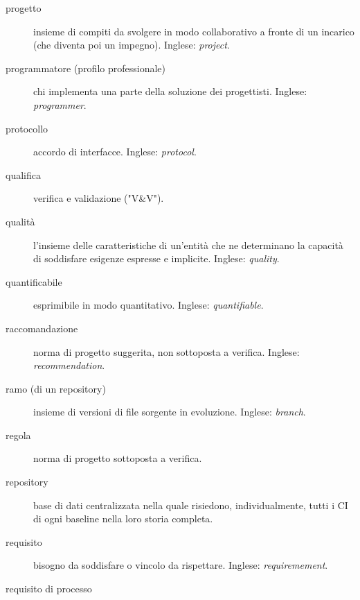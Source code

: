 \documentclass[a4paper]{article}
\begin{document}
\begin{description}
	\item[progetto] 

			insieme di compiti da svolgere in modo collaborativo a fronte di un incarico (che diventa poi un impegno). Inglese: \emph{project}.
			
	\item[programmatore (profilo professionale)] 

			chi implementa una parte della soluzione dei progettisti. Inglese: \emph{programmer}.
			
	\item[protocollo] 

			accordo di interfacce. Inglese: \emph{protocol}.
			
	\item[qualifica] 

			verifica e validazione ("V\&{}V").
			
	\item[qualità] 

			l'insieme delle caratteristiche di un'entità che ne determinano la capacità di soddisfare esigenze espresse e implicite. Inglese: \emph{quality}.
			
	\item[quantificabile] 

			esprimibile in modo quantitativo. Inglese: \emph{quantifiable}.
			
	\item[raccomandazione] 

			norma di progetto suggerita, non sottoposta a verifica. Inglese: \emph{recommendation}.
			
	\item[ramo (di un repository)] 

			insieme di versioni di file sorgente in evoluzione. Inglese: \emph{branch}.
			
	\item[regola] 

			norma di progetto sottoposta a verifica.
			
	\item[repository] 

			base di dati centralizzata nella quale risiedono, individualmente, tutti i CI di ogni baseline nella loro storia completa.
			
	\item[requisito] 

			bisogno da soddisfare o vincolo da rispettare. Inglese: \emph{requiremement}.
			
	\item[requisito di processo] 


\end{description}
\end{document}
